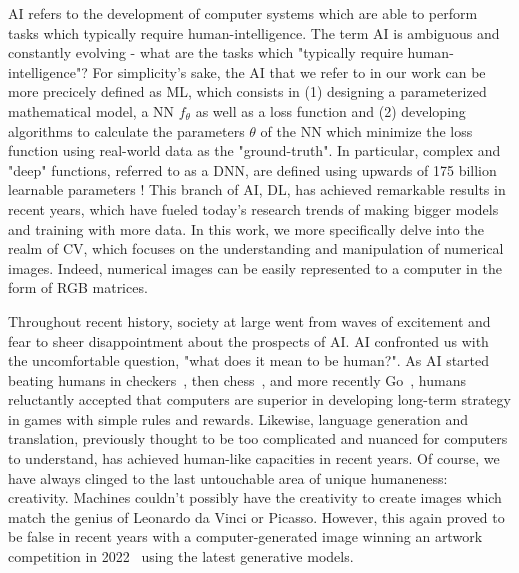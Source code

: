 \ac{AI} refers to the development of computer systems which are able to perform tasks which typically require 
human-intelligence. The term \ac{AI} is ambiguous and constantly evolving - what are the tasks which "typically require human-intelligence"? 
 For simplicity's sake, the \ac{AI} that we refer to in our work can be more precicely defined as 
\ac{ML}, which consists in (1) designing a parameterized mathematical model, a \ac{NN} $f_\theta$ as well as a loss function and 
(2) developing algorithms to calculate the parameters $\theta$ of the \ac{NN} which minimize the loss 
function using real-world data as the "ground-truth". In particular, complex and "deep" functions, referred to as a
\ac{DNN}, are defined using upwards of 175 billion learnable parameters \citep{gpt3}! This branch of \ac{AI}, \ac{DL}, 
has achieved remarkable results in recent years, which have fueled today's research trends of making bigger models and training 
with more data. In this work, we more specifically delve into the realm of \ac{CV}, which focuses on the understanding and manipulation of 
numerical images. Indeed, numerical images can be easily
represented to a computer in the form of RGB matrices.


Throughout recent history, society at large went from waves of excitement and fear to sheer disappointment about the prospects 
of \ac{AI}. \ac{AI} confronted us with the uncomfortable question, "what does it mean to be human?". As \ac{AI} started beating 
humans in checkers~\citep{checkers_is_solved}, then chess~\citep{CAMPBELL200257}, and more recently Go~\citep{silver2017mastering}, 
humans reluctantly accepted that computers are 
superior in developing long-term strategy in games with simple rules and rewards. Likewise, language generation and translation, previously 
thought to be too complicated and nuanced for computers to understand, has achieved human-like capacities in recent years. Of course,
we have always clinged to the last untouchable area of unique humaneness: creativity. Machines couldn't possibly have the creativity to 
create images which match 
the genius of Leonardo da Vinci or Picasso. However, this again proved to be false in recent years with a computer-generated image winning an artwork
competition in 2022~\citep{artcomp} using the latest generative models. 

